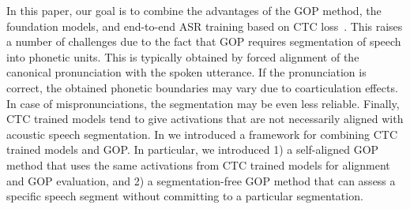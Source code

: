 

In this paper, our goal is to combine the advantages of the GOP method, the foundation models, and end-to-end ASR training based on CTC loss~\cite{CTC}.
This raises a number of challenges due to the fact that GOP requires segmentation of speech into phonetic units.
This is typically obtained by forced alignment of the canonical pronunciation with the spoken utterance. 
If the pronunciation is correct, the obtained phonetic boundaries may vary due to coarticulation effects.
In case of mispronunciations, the segmentation may be even less reliable.
Finally, CTC trained models tend to give activations that are not necessarily aligned with acoustic speech segmentation.
In \cite{cao24b_interspeech} we introduced a framework for combining CTC trained models and GOP.
In particular, we introduced 1) a self-aligned GOP method that uses the same activations from CTC trained models for alignment and GOP evaluation, and 2) a segmentation-free GOP method that can assess a specific speech segment without committing to a particular segmentation.

